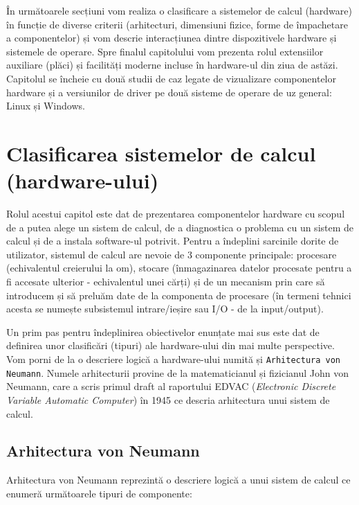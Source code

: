 În următoarele secțiuni vom realiza o clasificare a sistemelor de calcul (hardware) în funcție de diverse criterii (arhitecturi, dimensiuni fizice, forme de împachetare a componentelor) și vom descrie interacțiunea dintre dispozitivele hardware și sistemele de operare.
Spre finalul capitolului vom prezenta rolul extensiilor auxiliare (plăci) și facilități moderne incluse în hardware-ul din ziua de astăzi.
Capitolul se încheie cu două studii de caz legate de vizualizare componentelor hardware și a versiunilor de driver pe două sisteme de operare de uz general: Linux și Windows.

\section{Clasificarea sistemelor de calcul (hardware-ului)}
\label{sec:hw:class}

Rolul acestui capitol este dat de prezentarea componentelor hardware cu scopul de a putea alege un sistem de calcul, de a diagnostica o problema cu un sistem de calcul și de a instala software-ul potrivit.
Pentru a îndeplini sarcinile dorite de utilizator, sistemul de calcul are nevoie de 3 componente principale: procesare (echivalentul creierului la om), stocare (înmagazinarea datelor procesate pentru a fi accesate ulterior - echivalentul unei cărți) și de un mecanism prin care să introducem și să preluăm date de la componenta de procesare (în termeni tehnici acesta se numește subsistemul intrare/ieșire sau I/O - de la input/output).

Un prim pas pentru îndeplinirea obiectivelor enunțate mai sus este dat de definirea unor clasificări (tipuri) ale hardware-ului din mai multe perspective.
Vom porni de la o descriere logică a hardware-ului numită și \texttt{Arhitectura von Neumann}.
Numele arhitecturii provine de la matematicianul și fizicianul John von Neumann, care a scris primul draft al raportului EDVAC  (\textit{Electronic Discrete Variable Automatic Computer}) în 1945 ce descria arhitectura unui sistem de calcul.

\subsection{Arhitectura von Neumann}
\label{sec:hw:class:von-neumann}

Arhitectura von Neumann reprezintă o descriere logică a unui sistem de calcul ce enumeră următoarele tipuri de componente:

